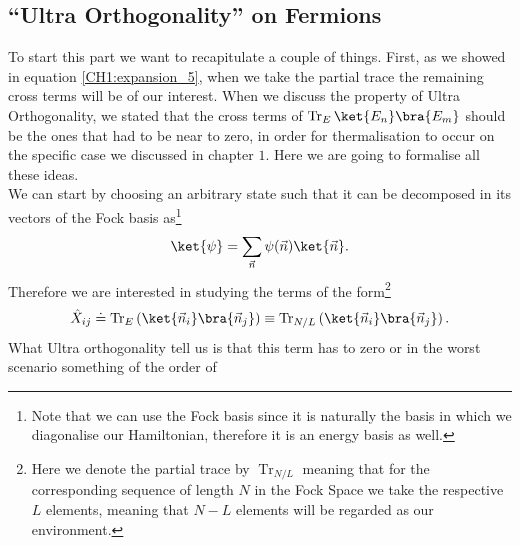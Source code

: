 \subsection{``Ultra Orthogonality'' on Fermions}
To start this part we want to recapitulate a couple of things. First, as we showed in equation \eqref{CH1:expansion_5}, when we take the partial trace the remaining cross terms  will be of our interest. When we discuss the property of Ultra Orthogonality, we stated that the cross terms of $\operatorname{Tr}_{E}\ket{E_n}\bra{E_m}$ should be the ones that had to be near to zero, in order for thermalisation to occur on the specific case we discussed in chapter $1$. Here we are going to formalise all these ideas.\\
We can start by choosing an arbitrary state such that it can be decomposed in its vectors of the Fock basis as\footnote{Note that we can use the Fock basis since it is naturally the basis in which we diagonalise our Hamiltonian, therefore it is an energy basis as well.}
\begin{equation}
\ket{\psi} = \sum_{\vec{n}}\psi(\vec{n})\ket{\vec{n}}.
\end{equation}
Therefore we are interested in studying the terms of the form\footnote{Here we denote the partial trace by $\operatorname{Tr}_{N/L}$ meaning that for the corresponding sequence of length $N$ in the Fock Space we take the respective $L$ elements, meaning that $N-L$ elements will be regarded as our environment.}
\begin{equation}
\hat{X}_{ij} \doteq \operatorname{Tr}_{E}\left(\ket{\vec{n}_i}\bra{\vec{n}_j}\right) \equiv \operatorname{Tr}_{N/L}\left(\ket{\vec{n}_i}\bra{\vec{n}_j}\right).
\end{equation}
What Ultra orthogonality tell us is that this term has to zero or in the worst scenario something of the order of 
